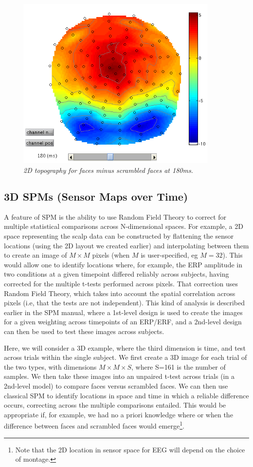 \begin{figure}
\begin{center}
\includegraphics[width=100mm]{multimodal/figures/eeg_topo}
\caption{\em 2D topography for faces minus scrambled faces at 180ms. \label{multimodal:fig:5}}
\end{center}
\end{figure}

\subsection{3D SPMs (Sensor Maps over Time) \label{multimodal:eeg:3DSPM}}

A feature of SPM is the ability to use Random Field Theory to correct for multiple statistical comparisons across N-dimensional spaces. For example, a 2D space representing the scalp data can be constructed by flattening the sensor locations (using the 2D layout we created earlier) and interpolating between them to create an image of $M\times M$ pixels (when $M$ is user-specified, eg $M=32$). This would allow one to identify locations where, for example, the ERP amplitude in two conditions at a given timepoint differed reliably across subjects, having corrected for the multiple t-tests performed across pixels. That correction uses Random Field Theory, which takes into account the spatial correlation across pixels (i.e, that the tests are not independent). This kind of analysis is described earlier in the SPM manual, where a 1st-level design is used to create the images for a given weighting across timepoints of an ERP/ERF, and a 2nd-level design can then be used to test these images across subjects.

Here, we will consider a 3D example, where the third dimension is time, and test across trials within the single subject. We first create a 3D image for each trial of the two types, with dimensions $M\times M\times S$, where S=161 is the number of samples. We then take these images into an unpaired t-test across trials (in a 2nd-level model) to compare faces versus scrambled faces. We can then use classical SPM to identify locations in space and time in which a reliable difference occurs, correcting across the multiple comparisons entailed. This would be appropriate if, for example, we had no a priori knowledge where or when the difference between faces and scrambled faces would emerge\footnote{Note that the 2D location in sensor space for EEG will depend on the choice of montage.}.

